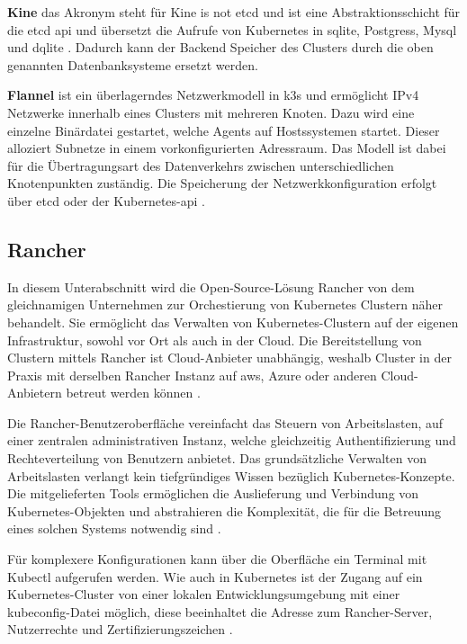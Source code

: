 \textbf{Kine}
das Akronym steht für \glqq Kine is not etcd\grqq{} und ist eine Abstraktionsschicht für die etcd \acs{api} und übersetzt die Aufrufe von Kubernetes in sqlite, Postgress, Mysql und dqlite \cite{k3sgit}.
Dadurch kann der Backend Speicher des Clusters durch die oben genannten Datenbanksysteme ersetzt werden.

\textbf{Flannel}
ist ein überlagerndes Netzwerkmodell in k3s und ermöglicht IPv4 Netzwerke innerhalb eines Clusters mit mehreren Knoten.
Dazu wird eine einzelne Binärdatei gestartet, welche Agents auf Hostssystemen startet. Dieser alloziert Subnetze in einem vorkonfigurierten Adressraum.
Das Modell ist dabei für die Übertragungsart des Datenverkehrs zwischen unterschiedlichen Knotenpunkten zuständig.
Die Speicherung der Netzwerkkonfiguration erfolgt über etcd oder der Kubernetes-\acs{api} \cite{flannel}.


\subsection{Rancher}
In diesem Unterabschnitt wird die Open-Source-Lösung Rancher von dem gleichnamigen Unternehmen zur Orchestierung von Kubernetes Clustern näher behandelt.
Sie ermöglicht das Verwalten von Kubernetes-Clustern auf der eigenen Infrastruktur, sowohl vor Ort als auch in der Cloud.
Die Bereitstellung von Clustern mittels Rancher ist Cloud-Anbieter unabhängig,
weshalb Cluster in der Praxis mit derselben Rancher Instanz auf \acs{aws}, Azure oder anderen Cloud-Anbietern betreut werden können \cite{rancher}.

Die Rancher-Benutzeroberfläche vereinfacht das Steuern von Arbeitslasten, auf einer zentralen administrativen Instanz, welche gleichzeitig Authentifizierung und Rechteverteilung von Benutzern anbietet.
Das grundsätzliche Verwalten von Arbeitslasten verlangt kein tiefgründiges Wissen bezüglich Kubernetes-Konzepte. 
Die mitgelieferten Tools ermöglichen die Auslieferung und Verbindung von Kubernetes-Objekten und abstrahieren die Komplexität, die für die Betreuung eines solchen Systems notwendig sind \cite{rancher,AzureKubernetesService}.

Für komplexere Konfigurationen kann über die Oberfläche ein Terminal mit Kubectl aufgerufen werden.
Wie auch in Kubernetes ist der Zugang auf ein Kubernetes-Cluster von einer lokalen Entwicklungsumgebung mit einer kubeconfig-Datei möglich, diese beeinhaltet die Adresse zum Rancher-Server, Nutzerrechte und Zertifizierungszeichen \cite{rancherKubeconfig}.

